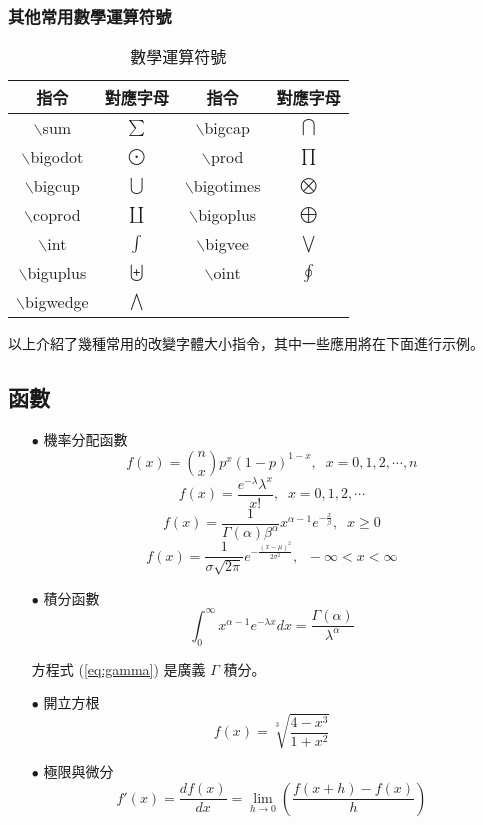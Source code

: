 \subsubsection{其他常用數學運算符號}
\begin{longtable}{c c c c}
    \caption{數學運算符號}\label{tb:sign} \\
     指令 & 對應字母 & 指令 & 對應字母 \\\hline 
     {\A $\backslash$sum} & $\sum$ & {\A $\backslash$bigcap} & $\bigcap$ \\
     {\A $\backslash$bigodot}  & $\bigodot$ & {\A $\backslash$prod} & $\prod$ \\
     {\A $\backslash$bigcup} & $\bigcup$ & {\A $\backslash$bigotimes} & $\bigotimes$ \\
     {\A $\backslash$coprod} & $\coprod$ & {\A $\backslash$bigoplus} & $\bigoplus$ \\
     {\A $\backslash$int} & $\int$ & {\A $\backslash$bigvee} & $\bigvee$ \\
     {\A $\backslash$biguplus} & $\biguplus$ & {\A $\backslash$oint} & $\oint$ \\
     {\A $\backslash$bigwedge} &  $\bigwedge$ &   &    \\\hline
\end{longtable}

以上介紹了幾種常用的改變字體大小指令，其中一些應用將在下面進行示例。

\subsection{函數}

\begin{itemize}
\item[$\bullet$] 機率分配函數
$$f(x)={n\choose x}p^x(1-p)^{1-x}, \;\; x=0,1,2,\cdots,n$$ 
$$f(x)=\frac{e^{-\lambda}\lambda^x}{x!}, \;\;  x=0,1,2,\cdots$$ 
$$f(x)=\frac{1}{\Gamma(\alpha)\beta^\alpha}x^{\alpha-1}e^{-\frac{x}{\beta}}, \;\; x\geq 0$$
$$f(x)=\frac{1}{\sigma\sqrt{2\pi}}e^{-\frac{(x-\mu)^2}{2\sigma^2}}, \;\;  -\infty < x < \infty $$

\item[$\bullet$] 積分函數
  \begin{equation}\label{eq:gamma}%
  \int^\infty_0 x^{\alpha-1}e^{-\lambda x} dx = \frac{\Gamma(\alpha)}{\lambda^{\alpha}}
  \end{equation}

方程式  (\ref{eq:gamma}) 是廣義 $\Gamma$ 積分。

\item[$\bullet$] 開立方根
$$f(x)=\sqrt[3]{\frac {\displaystyle 4-x^{3}}{\displaystyle 1+x^{2}}}$$

\item[$\bullet$] 極限與微分
$$f'(x)=\frac{df(x)}{dx}=\lim_{h\rightarrow 0}\left(\frac{f(x+h)-f(x)}{h}\right)$$

\end{itemize}



